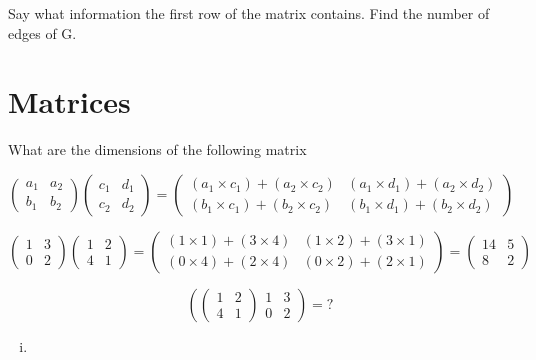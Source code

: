 \documentclass[]{report}
\begin{document}
\begin{itemize}
Say what information the first row of the matrix contains.
Find the number of edges of G.





\section{Matrices}

What are the dimensions of the following matrix


\[ \left(
\begin{array}{cc}
a_1 & a_2 \\ 
b_1 & b_2
\end{array} \right)\left(
\begin{array}{cc}
c_1 & d_1 \\ 
c_2 & d_2
\end{array} \right) = \left(
\begin{array}{cc}
(a_1 \times c_1) + (a_2 \times c_2) & (a_1 \times d_1) + (a_2 \times d_2) \\ 
(b_1 \times c_1) + (b_2 \times c_2) & (b_1 \times d_1) + (b_2 \times d_2)
\end{array} \right) \]

\bigskip
\large{
\[ \left(
\begin{array}{cc}
1 & 3 \\ 
0 & 2
\end{array} \right)\left(
\begin{array}{cc}
1 & 2 \\ 
4 & 1
\end{array} \right) = \left(
\begin{array}{cc}
(1 \times 1) + (3 \times 4) & (1 \times 2) + (3 \times 1) \\ 
(0 \times 4) + (2 \times 4) & (0 \times 2) + (2 \times 1)
\end{array} \right) = \left(
\begin{array}{cc}
14 & 5 \\ 
8 & 2
\end{array} \right) \]
}

\[ \left(
\left(
\begin{array}{cc}
1 & 2 \\ 
4 & 1
\end{array} \right)
\begin{array}{cc}
1 & 3 \\ 
0 & 2
\end{array} \right) = ? \]


\begin{enumerate}[(i)]
\item
\end{enumerate}


\end{itemize}
\end{document}
